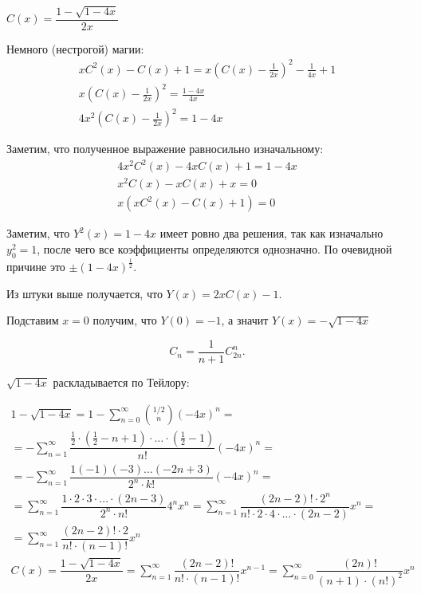 \begin{thrm}{}{}
    \( C(x) = \dfrac{1 - \sqrt{1 - 4x}}{2x} \)
\end{thrm}

Немного (нестрогой) магии:
\begin{gather*}
    x C^2 (x) - C(x) + 1 = x \left( C(x) - \frac{1}{2x} \right)^2 - \frac{1}{4x} + 1
    \\
    x \left( C(x) - \frac{1}{2x} \right)^2 = \frac{1 - 4x}{4x}
    \\
    4x^2 \left( C(x) - \frac{1}{2x} \right)^2 = 1 - 4x
\end{gather*}

Заметим, что полученное выражение равносильно изначальному:
\begin{gather*}
    4x^2 C^2 (x) - 4x C(x) + 1 = 1 - 4x
    \\
    x^2 C(x) - x C(x) + x = 0
    \\
    x (x C^2 (x) - C(x) + 1) = 0
\end{gather*}

Заметим, что \( Y^2 (x) = 1 - 4x \) имеет ровно два решения, так как изначально \( y_0^2 = 1 \),
после чего все коэффициенты определяются однозначно.
По очевидной причине это \( \pm (1 - 4x)^{\frac{1}{2}} \).

Из штуки выше получается, что \( Y(x)  = 2x C(x) - 1 \).

Подставим \( x = 0 \) получим, что \( Y(0) = -1 \), а значит \( Y(x) = -\sqrt{1 - 4x} \)

\begin{coroll}{}{}
    \[
        C_n = \dfrac{1}{n + 1} C_{2n}^{n}.
    \]
\end{coroll}

\( \sqrt{1 - 4x} \) раскладывается по Тейлору:

\begin{gather*}
    1 - \sqrt{1 - 4x} = 1 - \sum\limits_{n=0}^{\infty} \binom{1/2}{n} (-4x)^n
    =
    \\
    =
    -\sum\limits_{n=1}^{\infty} \dfrac{\frac{1}{2} \cdot \left( \frac{1}{2} - n + 1 \right) \cdot \ldots
        \cdot \left( \frac{1}{2} - 1 \right)}{n!} (-4x)^n
    =
    \\
    =
    -\sum\limits_{n=1}^{\infty} \dfrac{1 (-1) (-3) \ldots (-2n + 3)}{2^n \cdot k!} (-4x)^n
    =
    \\
    =
    \sum\limits_{n=1}^{\infty} \dfrac{1 \cdot 2 \cdot 3 \cdot \ldots \cdot (2n - 3)}{2^n \cdot n!} 4^n x^n
    =
    \sum\limits_{n=1}^{\infty} \dfrac{(2n - 2)! \cdot 2^n}{n! \cdot 2 \cdot 4 \cdot \ldots \cdot (2n-2)} x^n
    =
    \\
    =
    \sum\limits_{n=1}^{\infty} \dfrac{(2n - 2)! \cdot 2}{n! \cdot (n - 1)!} x^n
    \\
    C(x)
    =
    \dfrac{1 - \sqrt{1 - 4x}}{2x}
    =
    \sum\limits_{n=1}^{\infty} \dfrac{(2n - 2)!}{n! \cdot (n - 1)!} x^{n-1}
    =
    \sum\limits_{n=0}^{\infty} \dfrac{(2n)!}{(n + 1) \cdot (n!)^2} x^{n}
\end{gather*}
